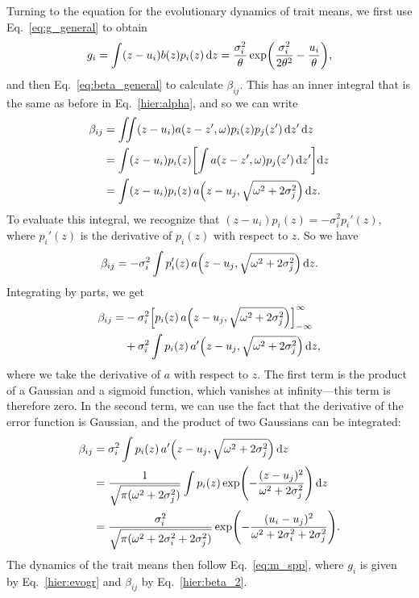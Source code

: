 \documentclass[10pt]{article}
\newcommand{\ud}{\text{d}}
\let\originalleft\left
\let\originalright\right
\renewcommand{\left}{\mathopen{}\mathclose\bgroup\originalleft}
\renewcommand{\right}{\aftergroup\egroup\originalright}
\begin{document}
Turning to the equation for the evolutionary dynamics of trait means, we first use Eq.~\ref{eq:g_general} to obtain
\begin{equation}
  \label{hier:evogr}
  g_i = \int (z - u_i) b(z) p_i(z) \,\ud z
  = \frac{\sigma_i^2}{\theta} \exp\left(\frac{\sigma_i^2}{2\theta^2} - \frac{u_i}{\theta} \right) ,
\end{equation}
and then Eq.~\ref{eq:beta_general} to calculate $\beta_{ij}$. This has an inner integral that is the same as before in Eq.~\ref{hier:alpha}, and so we can write
\begin{equation}
  \label{hier:beta}
  \begin{aligned}
  \beta_{ij} &= \iint (z - u_i) a(z-z',\omega) p_i(z) p_j(z')
  \,\ud z' \,\ud z
  \\ &= \int (z-u_i)p_i(z)\left[\int a(z-z',\omega) p_j(z')
  \,\ud z' \right] \ud z
  \\ &= \int (z-u_i) p_i(z)\,a\left(z-u_j,\sqrt{\omega^2+2\sigma_j^2}
  \right) \, \ud z .
  \end{aligned}
\end{equation}
To evaluate this integral, we recognize that $(z-u_i) p_i(z) = -\sigma_i^2 p_i'(z)$, where $p_i'(z)$ is the derivative of $p_i(z)$ with respect to $z$. So we have
\begin{equation}
\beta_{ij} = -\sigma_i^2 \int p_i'(z) \,a\left(z-u_j,
\sqrt{\omega^2+2\sigma_j^2}\right) \,\ud z .
\end{equation}
Integrating by parts, we get
\begin{equation}
\begin{aligned}
\beta_{ij} = &-\sigma_i^2 \left[
p_i(z) \,a\left(z-u_j,\sqrt{\omega^2+2\sigma_j^2}\right) \right]_{-\infty}^{\infty}
\\ &+ \sigma_i^2 \int p_i(z) \,a'\left(z-u_j,\sqrt{\omega^2+2\sigma_j^2}\right)
\,\ud z ,
\end{aligned}
\end{equation} 
where we take the derivative of $a$ with respect to $z$. The first term is the product of a Gaussian and a sigmoid function, which vanishes at infinity---this term is therefore zero. In the second term, we can use the fact that the derivative of the error function is Gaussian, and the product of two Gaussians can be integrated: 
\begin{equation}    
\begin{aligned}
\label{hier:beta_2}
\beta_{ij} &= \sigma_i^2 \int p_i(z) \,a'\left(z-u_j,\sqrt{\omega^2+2\sigma_j^2}
\right) \, \ud z
\\ &= \frac{1}{\sqrt{\pi(\omega^2 + 2\sigma_j^2)}} \int p_i(z)
\exp\left(-\frac{(z-u_j)^2}{\omega^2 + 2\sigma_j^2}\right) \,\ud z
\\ &= \frac{\sigma_i^2}{\sqrt{\pi(\omega^2 + 2\sigma_i^2 + 2\sigma_j^2)}}
\exp\left(-\frac{(u_i-u_j)^2}{\omega^2 + 2\sigma_i^2 + 2\sigma_j^2}\right) .
\end{aligned}
\end{equation}
The dynamics of the trait means then follow Eq.~\ref{eq:m_spp}, where $g_i$ is given by Eq.~\ref{hier:evogr} and $\beta_{ij}$ by Eq.~\ref{hier:beta_2}.
\end{document}
